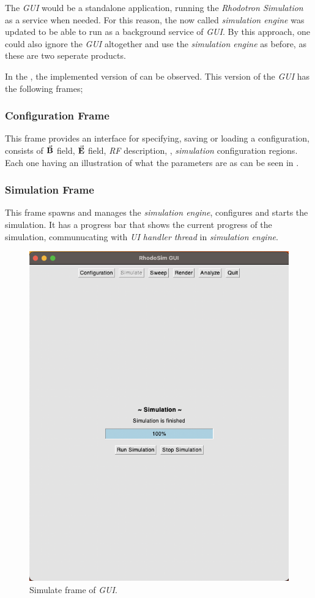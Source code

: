 \documentclass[a4paper,oneside,12pt]{report}
\numberwithin{equation}{chapter}
\begin{document}
The \textit{GUI} would be a standalone application, running the \textit{Rhodotron Simulation} as a service when needed. 
For this reason, the now called \textit{simulation engine} was updated to be able to run as a background service of \textit{GUI}.
By this approach, one could also ignore the \textit{GUI} altogether and use the \textit{simulation engine} as before, as these are two seperate products.

In the , the implemented version of  can be observed. This version of the \textit{GUI} has the following frames;

\subsubsection{Configuration Frame}
This frame provides an interface for specifying, saving or loading a configuration, consists of $\vec{\textbf{B}}$ field, $\vec{\textbf{E}}$ field, \textit{RF} description, \egun, \textit{simulation} configuration regions.
Each one having an illustration of what the parameters are as can be seen in .

\subsubsection{Simulation Frame}
This frame spawns and manages the \textit{simulation engine}, configures and starts the simulation. 
It has a progress bar that shows the current progress of the simulation, communucating with \textit{UI handler thread} in \textit{simulation engine}.

\begin{figure}
    \centering
    \includegraphics[width=0.8\linewidth]{./figures/rhodoSim/GUI_simulate_frame.png}
    \caption{Simulate frame of \textit{GUI}.}
    \label{fig:gui_simulate_1}
\end{figure}
\end{document}
